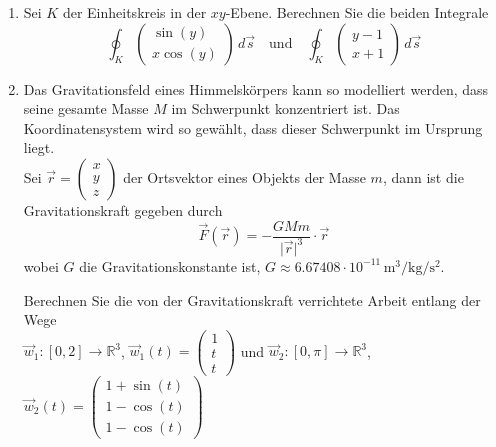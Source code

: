 \begin{ueb}
\begin{enumerate}
              \[
                  \quad \vec c_1 : [0,1] \rightarrow \mathbb{R}^2, \quad \vec c_1(t) = \begin{pmatrix} t \\ t \end{pmatrix} \quad \text{bzw.} \quad \vec c_2 : [0,1] \rightarrow \mathbb{R}^2, \quad \vec c_2(t) = \begin{pmatrix} t \\ t^2 \end{pmatrix}.
              \]
        \item Sei \(K\) der Einheitskreis in der \(xy\)-Ebene. Berechnen Sie die beiden Integrale
              \[\oint_{K} \begin{pmatrix}
                      \sin(y) \\
                      x \cos(y)
                  \end{pmatrix} \, d\vec{s} \quad \text{und} \quad \oint_{K} \begin{pmatrix}
                      y-1 \\
                      x + 1
                  \end{pmatrix} \, d\vec{s}\]
        \item


              Das Gravitationsfeld eines Himmelskörpers kann so modelliert werden, dass seine gesamte Masse \(M\) im Schwerpunkt konzentriert ist. Das Koordinatensystem wird so gewählt, dass dieser Schwerpunkt im Ursprung liegt. \\
              Sei \(\vec{r} = \begin{pmatrix} x \\ y \\ z \end{pmatrix}\) der Ortsvektor eines Objekts der Masse \(m\), dann ist die Gravitationskraft gegeben durch
              \[ \vec{F} (\vec{r}) = -\frac{GMm}{\lvert \vec{r}\rvert^3} \cdot \vec{r} \]
              wobei \(G\) die Gravitationskonstante ist, \( G \approx 6.67408 \cdot 10^{-11} \, \si{\meter\cubed\per\kilogram\per\second\squared} \).

              Berechnen Sie die  von der Gravitationskraft verrichtete Arbeit entlang der Wege \\ \(\vec w_1: [0, 2] \to \mathbb{R}^3\), \( \vec w_1(t) = \begin{pmatrix} 1 \\ t \\ t \end{pmatrix}\) und \( \vec w_2: [0, \pi] \to \mathbb{R}^3\), \( \vec w_2(t) = \begin{pmatrix} 1 + \sin(t) \\ 1 - \cos(t) \\ 1-\cos(t) \end{pmatrix}\)



    \end{enumerate}

\end{ueb}
